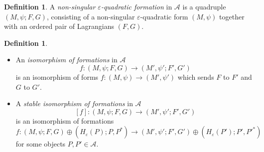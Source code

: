 \documentclass{article}
\theoremstyle{definition}
\newtheorem{defn}[theorem]{Definition}
\begin{document}
\begin{defn}
    
A \emph{non-singular \( \varepsilon \)-quadratic formation} in \( \mathcal{A} \) is a quadruple \( (M, \psi; F, G) \), consisting of a non-singular \( \varepsilon \)-quadratic form \( (M, \psi) \) together with an ordered pair of Lagrangians \( (F, G) \).
\end{defn} 

\begin{defn}

\begin{itemize}
  \item[(i)] An \emph{isomorphism of formations} in \( \mathcal{A} \)
  \[
  f : (M, \psi; F, G) \to (M', \psi'; F', G')
  \]
  is an isomorphism of forms \( f : (M, \psi) \to (M', \psi') \) which sends \( F \) to \( F' \) and \( G \) to \( G' \).

  \item[(ii)] A \emph{stable isomorphism of formations} in \( \mathcal{A} \)
  \[
  [f] : (M, \psi; F, G) \to (M', \psi'; F', G')
  \]
  is an isomorphism of formations
  \[
  f : (M, \psi; F, G) \oplus (H_\varepsilon(P); P, P^*) \to (M', \psi'; F', G') \oplus (H_\varepsilon(P'); P', P'^*)
  \]
  for some objects \( P, P' \in \mathcal{A} \).
\end{itemize}
    
\end{defn}
\end{document}
